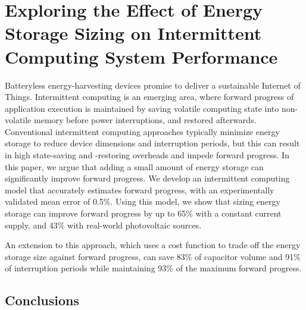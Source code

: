 
\graphicspath{{CapSizing/figure/}}

\chapter{Exploring the Effect of Energy Storage Sizing on Intermittent Computing System Performance}

Batteryless energy-harvesting devices promise to deliver a sustainable Internet of Things. Intermittent computing is an emerging area, where forward progress of application execution is maintained by saving volatile computing state into non-volatile memory before power interruptions, and restored afterwards. Conventional intermittent computing approaches typically minimize energy storage to reduce device dimensions and interruption periods, 
but this can result in high state-saving and -restoring overheads and impede forward progress. 
In this paper, we argue that adding a small amount of energy storage can significantly improve forward progress. 
We develop an intermittent computing model that accurately estimates forward progress, with an experimentally validated mean error of 0.5\%. 
Using this model, we show that sizing energy storage can improve forward progress by up to 65\% with a constant current supply, and 43\% with real-world photovoltaic sources. 

An extension to this approach, which uses a cost function to trade off the energy storage size against forward progress, can save 83\% of capacitor volume and 91\% of interruption periods while maintaining 93\% of the maximum forward progress.




    
       
   
            


\section{Conclusions} \label{section:conclusion}



